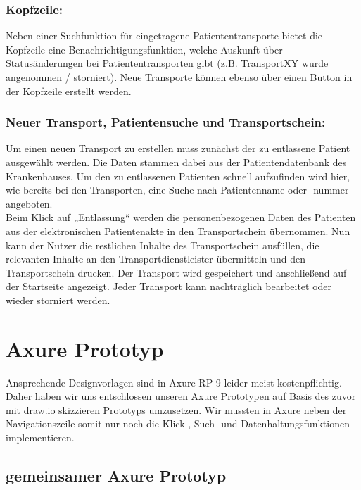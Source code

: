 \documentclass[a4paper, ngerman, 12pt]{scrartcl}
\begin{document}
\subsubsection*{Kopfzeile:}
Neben einer Suchfunktion für eingetragene Patiententransporte bietet die Kopfzeile eine Benachrichtigungsfunktion, welche Auskunft über Statusänderungen bei Patiententransporten gibt (z.B. TransportXY wurde angenommen / storniert). Neue Transporte können ebenso über einen Button in der Kopfzeile erstellt werden.
\subsubsection*{Neuer Transport, Patientensuche und Transportschein:}
Um einen neuen Transport zu erstellen muss zunächst der zu entlassene Patient ausgewählt werden. Die Daten stammen dabei aus der Patientendatenbank des Krankenhauses. Um den zu entlassenen Patienten schnell aufzufinden wird hier, wie bereits bei den Transporten, eine Suche nach Patientenname oder -nummer angeboten.\\

Beim Klick auf „Entlassung“ werden die personenbezogenen Daten des Patienten aus der elektronischen Patientenakte in den Transportschein übernommen. Nun kann der Nutzer die restlichen Inhalte des Transportschein ausfüllen, die relevanten Inhalte an den Transportdienstleister übermitteln und den Transportschein drucken. Der Transport wird gespeichert und anschließend auf der Startseite angezeigt. Jeder Transport kann nachträglich bearbeitet oder wieder storniert werden.
\section{Axure Prototyp}
Ansprechende Designvorlagen sind in Axure RP 9 leider meist kostenpflichtig. Daher haben wir uns entschlossen unseren Axure Prototypen auf Basis des zuvor mit draw.io skizzieren Prototyps umzusetzen. Wir mussten in Axure neben der Navigationszeile somit nur noch die Klick-, Such- und Datenhaltungsfunktionen implementieren.
\subsection{gemeinsamer Axure Prototyp}
\end{document}
